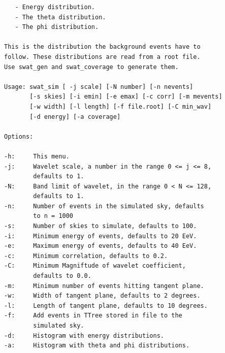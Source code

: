 \documentclass[12pt]{article}
\begin{document}
{\begin{lstlisting}
   - Energy distribution.
   - The theta distribution.
   - The phi distribution.

This is the distribution the background events have to
follow. These distributions are read from a root file.
Use swat_gen and swat_coverage to generate them.

Usage: swat_sim [ -j scale] [-N number] [-n nevents] 
       [-s skies] [-i emin] [-e emax] [-c corr] [-m mevents]
       [-w width] [-l length] [-f file.root] [-C min_wav]
       [-d energy] [-a coverage]

Options:

-h:     This menu.
-j:     Wavelet scale, a number in the range 0 <= j <= 8,
        defaults to 1.
-N:     Band limit of wavelet, in the range 0 < N <= 128,
        defaults to 1.
-n:     Number of events in the simulated sky, defaults
        to n = 1000
-s:     Number of skies to simulate, defaults to 100.
-i:     Minimum energy of events, defaults to 20 EeV.
-e:     Maximum energy of events, defaults to 40 EeV.
-c:     Minimum correlation, defaults to 0.2.
-C:     Minimum Magniftude of wavelet coefficient,
        defaults to 0.0.
-m:     Minimum number of events hitting tangent plane.
-w:     Width of tangent plane, defaults to 2 degrees.
-l:     Length of tangent plane, defaults to 10 degrees.
-f:     Add events in TTree stored in file to the
        simulated sky.
-d:     Histogram with energy distributions.
-a:     Histogram with theta and phi distributions.

\end{lstlisting}
}
\end{document}
